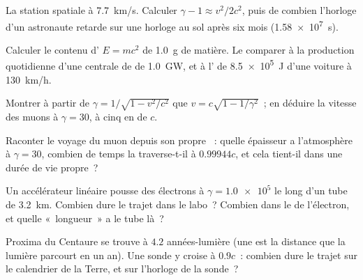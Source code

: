 \begin{exercise}[$\star\star$]\label{exo:g12:special-relativity:10}
La station spatiale  à \qty{7.7}{km/s}.
Calculer $\gamma - 1 \approx v^2/2c^2$, puis de combien l'horloge d'un
astronaute retarde sur une horloge au sol après six mois
(\qty{1.58e7}{s}).
\end{exercise}

\begin{exercise}[$\star\star$]\label{exo:g12:special-relativity:11}
Calculer le contenu d' $E = mc^2$ de
\qty{1.0}{g} de matière. Le comparer à la production quotidienne d'une
centrale de  de \qty{1.0}{GW}, et à
l' de \qty{8.5e5}{J} d'une
voiture à \qty{130}{km/h}.
\end{exercise}

\begin{exercise}[$\star\star\star$]\label{exo:g12:special-relativity:12}
Montrer à partir de $\gamma = 1/\sqrt{1 - v^2/c^2}$ que
$v = c\sqrt{1 - 1/\gamma^2}$~; en déduire la vitesse des muons à
$\gamma = 30$, à cinq 
en  de $c$.
\end{exercise}

\begin{exercise}[$\star\star\star$]\label{exo:g12:special-relativity:13}
Raconter le voyage du muon depuis son propre ~: quelle
épaisseur a l'atmosphère à $\gamma = 30$, combien de temps la
traverse-t-il à $0.99944c$, et cela tient-il dans une durée de vie
propre~?
\end{exercise}

\begin{exercise}[$\star\star\star$]\label{exo:g12:special-relativity:14}
Un accélérateur linéaire pousse des électrons à $\gamma = \num{1.0e5}$
le long d'un tube de \qty{3.2}{km}. Combien dure le trajet dans le
labo~? Combien dans le  de l'électron, et quelle
«~longueur~» a le tube là~?
\end{exercise}

\begin{exercise}[$\star\star\star$]\label{exo:g12:special-relativity:15}
Proxima du Centaure se trouve à $4.2$
années-lumière (une
 est la distance que la
lumière parcourt en un an). Une sonde y croise à $0.9c$~: combien
dure le trajet sur le calendrier de la Terre, et sur l'horloge de la
sonde~?
\end{exercise}

